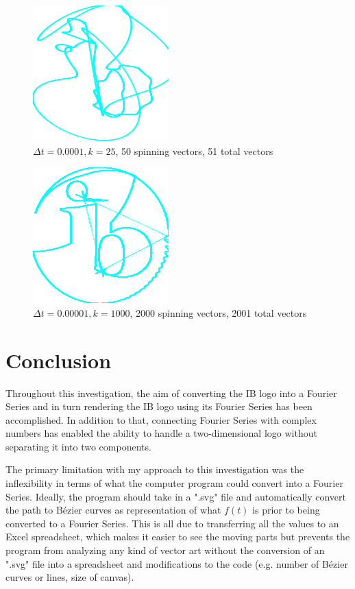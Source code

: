 \documentclass[letterpaper, 12pt]{article}
\begin{document}
\begin{figure}[H]
    \centering
    \includegraphics[width=.5\textwidth]{25.png}
    \caption{\protect\(\Delta t = 0.0001, k = 25\), 50 spinning vectors, 51 total vectors}
\end{figure}

\begin{figure}[H]
    \centering
    \includegraphics[width=.5\textwidth]{1000.png}
    \caption{\protect\(\Delta t = 0.00001, k = 1000\), 2000 spinning vectors, 2001 total vectors}
\end{figure}

\section{Conclusion}

Throughout this investigation, the aim of converting
the IB logo into a Fourier Series and in turn
rendering the IB logo using its Fourier Series has been
accomplished. In addition to that, connecting
Fourier Series with complex numbers has enabled
the ability to handle a two-dimensional
logo without separating it into two components.

The primary limitation with my approach to this investigation
was the inflexibility in terms of what the
computer program could convert into a Fourier Series.
Ideally, the program should take in a ".svg" file and
automatically convert the path to Bézier curves
as representation of what \(f(t)\) is
prior to being converted to a Fourier Series.
This is all due to transferring all the values
to an Excel spreadsheet, which makes it easier to
see the moving parts but prevents the program
from analyzing any kind of vector art
without the conversion of an ".svg" file into
a spreadsheet and modifications to the code
(e.g. number of Bézier curves or lines, size of canvas).
\end{document}
